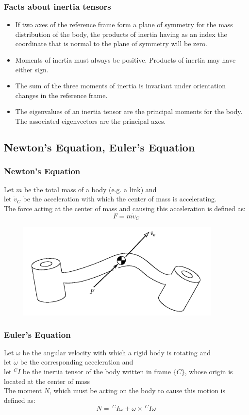 \documentclass[10pt,a4paper]{article}
\begin{document}
\subsubsection{Facts about inertia tensors}
\begin{itemize}
	\item If two axes of the reference frame form a plane of symmetry for the mass distribution of the body, the products of inertia having as an index the coordinate that is normal to the plane of symmetry will be zero.
	\item Moments of inertia must always be positive. Products of inertia may have either sign.
	\item The sum of the three moments of inertia is invariant under orientation changes in the reference frame.
	\item The eigenvalues of an inertia tensor are the principal moments for the body. The associated eigenvectors are the principal axes.
	
\end{itemize}


\subsection{Newton's Equation, Euler's Equation}
\subsubsection{Newton's Equation}
Let $m$ be the total mass of a body (e.g. a link) and \\
let $\dot v_C$ be the acceleration with which the center of mass is accelerating. \\
The force acting at the center of mass and causing this acceleration is defined as:
$$
	F = m\dot v_C
$$

\begin{figure}[H]
	\includegraphics[width=0.5\columnwidth]{imgs/link_newton.png}
\end{figure}

\subsubsection{Euler's Equation}
Let $\omega$ be the angular velocity with which a rigid body is rotating and \\
let $\dot \omega$ be the corresponding acceleration and \\
let $^CI$ be the inertia tensor of the body written in frame $\{C\}$, whose origin is located at the center of mass \\
The moment $N$, which must be acting on the body to cause this motion is defined as:
$$
	N = ~^CI\dot \omega + \omega \times ~^CI \omega
$$
\end{document}
